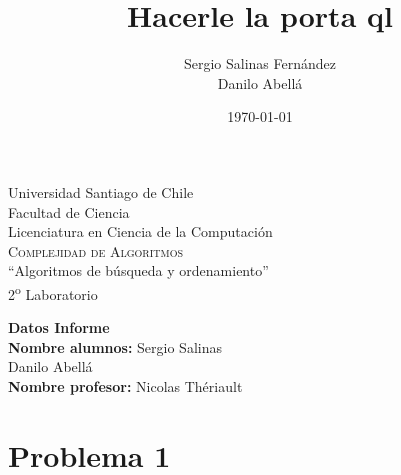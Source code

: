 \documentclass[10pt,letterpaper]{article}
\title{Hacerle la porta ql}								%
\author{Sergio Salinas Fern\'andez \\
Danilo Abellá}								%
\date{\today}											%
\begin{document}
\begin{titlepage}

\begin{center}

{\Large { Universidad Santiago de Chile\\Facultad de Ciencia\\Licenciatura en Ciencia de la Computación
 }}\\[5cm]



{\huge \textsc{Complejidad de Algoritmos}}\\[1.5cm]

{\Huge ``Algoritmos de
búsqueda y ordenamiento'' }\\[1.5cm]


{\LARGE 2\textsuperscript{o} Laboratorio}\\[8cm]

\hspace*{\fill} 
\end{center}
\begin{minipage}[l]{0.4\textwidth}
	\begin{flushleft}
	\linespread{1}
	\end{flushleft}
\end{minipage}
\begin{minipage}[l]{0.6\textwidth}

	\begin{flushright}
		
		\textbf{Datos Informe}\\[0.1cm]
		\large \textbf{Nombre alumnos:} Sergio Salinas\\
		\large Danilo Abellá\\
\large \textbf{Nombre profesor:} Nicolas Thériault \\
	\end{flushright}
\end{minipage}
\end{titlepage}
\newpage
\newpage


\tableofcontents
\pagebreak


\newpage
\section{Problema 1}
\end{document}
